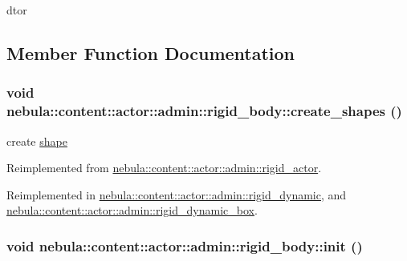 dtor 

\subsection{Member Function Documentation}
\hypertarget{classnebula_1_1content_1_1actor_1_1admin_1_1rigid__body_a649883f2e1d157c2b94cc475f458a3c4}{
\subsubsection[{create\_\-shapes}]{\setlength{\rightskip}{0pt plus 5cm}void nebula::content::actor::admin::rigid\_\-body::create\_\-shapes ()}}
\label{classnebula_1_1content_1_1actor_1_1admin_1_1rigid__body_a649883f2e1d157c2b94cc475f458a3c4}


create \hyperlink{namespacenebula_1_1content_1_1shape}{shape} 

Reimplemented from \hyperlink{classnebula_1_1content_1_1actor_1_1admin_1_1rigid__actor_a6a7daf14ba48ebe539588bfc18784267}{nebula::content::actor::admin::rigid\_\-actor}.

Reimplemented in \hyperlink{classnebula_1_1content_1_1actor_1_1admin_1_1rigid__dynamic_a263f07931e9281ea4044c522b567dde1}{nebula::content::actor::admin::rigid\_\-dynamic}, and \hyperlink{classnebula_1_1content_1_1actor_1_1admin_1_1rigid__dynamic__box_ad0aba702fbf1cb38fabc3b84f6a2ef93}{nebula::content::actor::admin::rigid\_\-dynamic\_\-box}.\hypertarget{classnebula_1_1content_1_1actor_1_1admin_1_1rigid__body_a549b82effcb63341aa4057712446ce22}{
\subsubsection[{init}]{\setlength{\rightskip}{0pt plus 5cm}void nebula::content::actor::admin::rigid\_\-body::init ()}}
\label{classnebula_1_1content_1_1actor_1_1admin_1_1rigid__body_a549b82effcb63341aa4057712446ce22}


